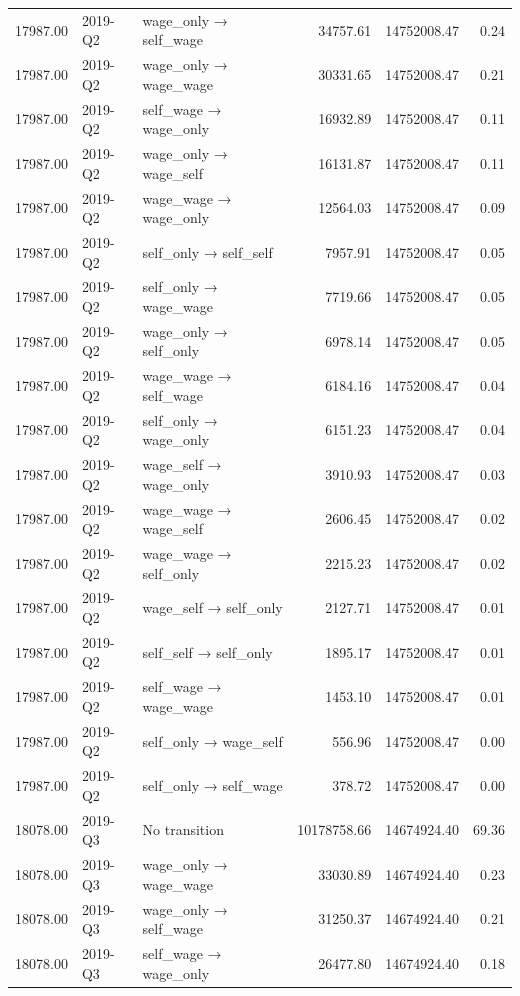 \begin{table}[ht]
{\begin{tabular}{rllrrr}
  17987.00 & 2019-Q2 & wage\_only → self\_wage & 34757.61 & 14752008.47 & 0.24 \\ 
  17987.00 & 2019-Q2 & wage\_only → wage\_wage & 30331.65 & 14752008.47 & 0.21 \\ 
  17987.00 & 2019-Q2 & self\_wage → wage\_only & 16932.89 & 14752008.47 & 0.11 \\ 
  17987.00 & 2019-Q2 & wage\_only → wage\_self & 16131.87 & 14752008.47 & 0.11 \\ 
  17987.00 & 2019-Q2 & wage\_wage → wage\_only & 12564.03 & 14752008.47 & 0.09 \\ 
  17987.00 & 2019-Q2 & self\_only → self\_self & 7957.91 & 14752008.47 & 0.05 \\ 
  17987.00 & 2019-Q2 & self\_only → wage\_wage & 7719.66 & 14752008.47 & 0.05 \\ 
  17987.00 & 2019-Q2 & wage\_only → self\_only & 6978.14 & 14752008.47 & 0.05 \\ 
  17987.00 & 2019-Q2 & wage\_wage → self\_wage & 6184.16 & 14752008.47 & 0.04 \\ 
  17987.00 & 2019-Q2 & self\_only → wage\_only & 6151.23 & 14752008.47 & 0.04 \\ 
  17987.00 & 2019-Q2 & wage\_self → wage\_only & 3910.93 & 14752008.47 & 0.03 \\ 
  17987.00 & 2019-Q2 & wage\_wage → wage\_self & 2606.45 & 14752008.47 & 0.02 \\ 
  17987.00 & 2019-Q2 & wage\_wage → self\_only & 2215.23 & 14752008.47 & 0.02 \\ 
  17987.00 & 2019-Q2 & wage\_self → self\_only & 2127.71 & 14752008.47 & 0.01 \\ 
  17987.00 & 2019-Q2 & self\_self → self\_only & 1895.17 & 14752008.47 & 0.01 \\ 
  17987.00 & 2019-Q2 & self\_wage → wage\_wage & 1453.10 & 14752008.47 & 0.01 \\ 
  17987.00 & 2019-Q2 & self\_only → wage\_self & 556.96 & 14752008.47 & 0.00 \\ 
  17987.00 & 2019-Q2 & self\_only → self\_wage & 378.72 & 14752008.47 & 0.00 \\ 
  18078.00 & 2019-Q3 & No transition & 10178758.66 & 14674924.40 & 69.36 \\ 
  18078.00 & 2019-Q3 & wage\_only → wage\_wage & 33030.89 & 14674924.40 & 0.23 \\ 
  18078.00 & 2019-Q3 & wage\_only → self\_wage & 31250.37 & 14674924.40 & 0.21 \\ 
  18078.00 & 2019-Q3 & self\_wage → wage\_only & 26477.80 & 14674924.40 & 0.18 \\ 

\end{tabular}}
\end{table}
